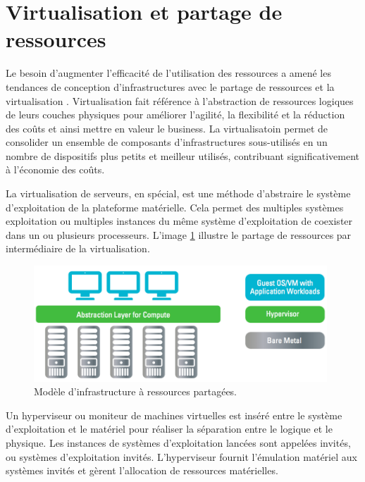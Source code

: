 \section{Virtualisation et partage de ressources}

Le besoin d'augmenter l'efficacité de l'utilisation des ressources a amené les tendances de conception d'infrastructures avec le partage de ressources et la virtualisation . Virtualisation fait référence à l'abstraction de ressources logiques de leurs couches physiques pour améliorer l'agilité, la flexibilité et la réduction des coûts et ainsi mettre en valeur le business. La virtualisatoin permet de consolider un ensemble de composants d'infrastructures sous-utilisés en un nombre de dispositifs plus petits et meilleur utilisés, contribuant significativement à l'économie des coûts.

La virtualisation de serveurs, en spécial, est une méthode d'abstraire le système d'exploitation de la plateforme matérielle. Cela permet des multiples systèmes exploitation ou multiples instances du même système d'exploitation de coexister dans un ou plusieurs processeurs. L'image \ref{virtinfra} illustre le partage de ressources par intermédiaire de la virtualisation.

\begin{figure}[h]
\begin{center}
\includegraphics[width=0.98\textwidth]{images/shared_infa_virt} 
\caption{Modèle d'infrastructure à ressources partagées. \cite{journeySDDC}}\label{virtinfra}
\end{center}
\end{figure}

Un hyperviseur ou moniteur de machines virtuelles est inséré entre le système d'exploitation et le matériel pour réaliser la séparation entre le logique et le physique. Les instances de systèmes d'exploitation lancées sont appelées invités, ou systèmes d'exploitation invités. L'hyperviseur fournit l'émulation matériel aux systèmes invités et gèrent l'allocation de ressources matérielles.  

